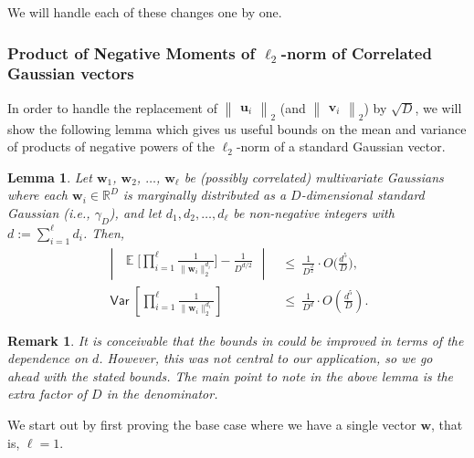 \documentclass[11pt]{article}
\newcommand{\inparen}[1]{\left ( #1 \right )}
\newcommand{\insquare}[1]{\left [ #1 \right ]}
\newcommand{\inabs}[1]{\begin{vmatrix} #1 \end{vmatrix}}
\newcommand{\norm}[2]{\begin{Vmatrix} #2 \end{Vmatrix}_{#1}}
\DeclareMathOperator*{\Ex}{\mathbb{E}}
\DeclareMathOperator*{\Var}{\mathsf{Var}}
\newcommand{\bu}{{\bm u}}
\newcommand{\bv}{{\bm v}}
\newcommand{\bw}{{\bm w}}
\newtheorem{lem}[theorem]{Lemma}
\newtheorem{remark}[theorem]{Remark}
\begin{document}
\noindent We will handle each of these changes one by one.

\subsubsection*{Product of Negative Moments of $\ell_2$-norm of Correlated Gaussian vectors}

In order to handle the replacement of $\norm{2}{\bu_i}$ (and $\norm{2}{\bv_i}$) by $\sqrt{D}$, we will show the following lemma which gives us useful bounds on the mean and variance of products of negative powers of the $\ell_2$-norm of a standard Gaussian vector. %

\begin{lem}\label{le:corr_norms_rec_ex}
	Let $\bw_1$, $\bw_2$, $\dots$, $\bw_{\ell}$ be (possibly correlated) multivariate Gaussians where each $\bw_i \in \mathbb{R}^D$ is marginally distributed as a $D$-dimensional standard Gaussian (i.e., $\gamma_D$), and let $d_1, d_2, \dots, d_{\ell}$ be non-negative integers with $d := \sum_{i=1}^{\ell} d_i$. Then,
	\begin{align*}
	\inabs{\Ex\bigg[\prod\limits_{i=1}^{\ell} \frac{1}{\|\bw_i\|_2^{d_i}}\bigg] - \frac{1}{D^{d/2}}} &~\le~ \frac{1}{D^{\frac{d}{2}}} \cdot O\bigg(\frac{d^5}{D} \bigg),\\
	\Var\insquare{\prod\limits_{i=1}^{\ell} \frac{1}{\|\bw_i\|_2^{d_i}}} &~\le~ \frac{1}{D^d} \cdot O\inparen{\frac{d^5}{D}}.
	\end{align*}
\end{lem}

\begin{remark}
	It is conceivable that the bounds in  could be improved in terms of the dependence on $d$. However, this was not central to our application, so we go ahead with the stated bounds. The main point to note in the above lemma is the extra factor of $D$ in the denominator.
\end{remark}

\noindent We start out by first proving the base case where we have a single vector $\bw$, that is, $\ell = 1$.
\end{document}
